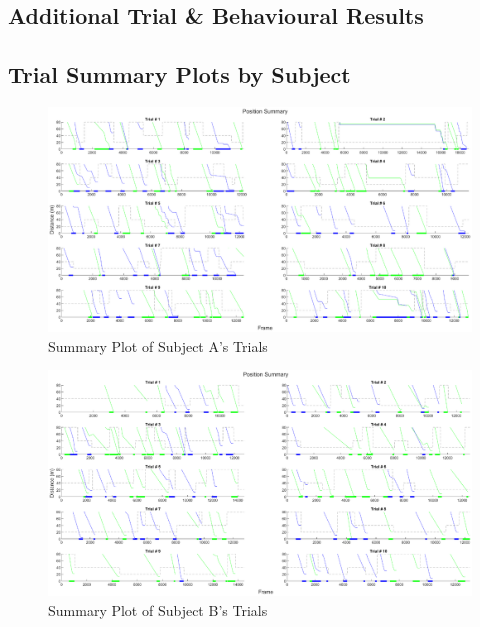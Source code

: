 \begin{appendices}
\chapter{Additional Trial \& Behavioural Results}
\label{appendix:ExtraResults0}

\section{Trial Summary Plots by Subject}
\label{appendix:ExtraResults0_1}
\begin{figure}[H]
    \centering
    \includegraphics[width=\linewidth, height=\plotHeight\linewidth]{figures/subject_a_summary.eps}
    \caption{Summary Plot of Subject A's Trials}
    \label{fig:SumA}
\end{figure}
\begin{figure}[H]
    \centering
    \includegraphics[width=\linewidth, height=\plotHeight\linewidth]{figures/subject_b_summary.eps}
    \caption{Summary Plot of Subject B's Trials}
    \label{fig:SumB}
\end{figure}
\begin{figure}[H]
    \centering

\end{figure}
\end{appendices}
